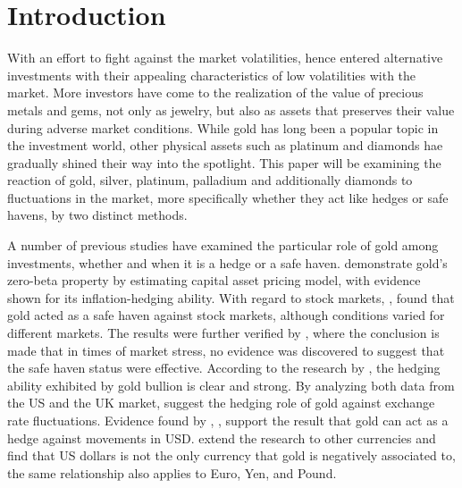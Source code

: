 \documentclass[preprint,authoryear,11pt]{elsarticle}
\begin{document}


\newpage
\section{Introduction}
\label{sec:introduction} \glsresetall

With an effort to fight against the market volatilities, hence entered alternative investments with their appealing characteristics of low volatilities with the market. More investors have come to the realization of the value of precious metals and gems, not only as jewelry, but also as assets that preserves their value during adverse market conditions. While gold has long been a popular topic in the investment world, other physical assets such as platinum and diamonds hae gradually shined their way into the spotlight. This paper will be examining the reaction of gold, silver, platinum, palladium and additionally diamonds to fluctuations in the market, more specifically whether they act like hedges or safe havens, by two distinct methods.

A number of previous studies have examined the particular role of gold among investments, whether and when it is a hedge or a safe haven. \citet{mccown_is_2006} demonstrate gold's zero-beta property by estimating capital asset pricing model, with evidence shown for its inflation-hedging ability. With regard to stock markets, \citet{baur_is_2009}, \citet{baur_is_2010} found that gold acted as a safe haven against stock markets, although conditions varied for different markets. The results were further verified by \citet{joy_gold_2011}, where the conclusion is made that in times of market stress, no evidence was discovered to suggest that the safe haven status were effective. According to the research by \citet{pullen_comparative_2011}, the hedging ability exhibited by gold bullion is clear and strong. By analyzing both data from the US and the UK market,\citet{ciner_hedges_2013} suggest the hedging role of gold against exchange rate fluctuations. Evidence found by \citet{reboredo_is_2013}, \citet{joy_gold_2011}, \citet{capie_gold_2005} support the result that gold can act as a hedge against movements in USD. \citet{pukthuanthong_gold_2011} extend the research to other currencies and find that US dollars is not the only currency that gold is negatively associated to, the same relationship also applies to Euro, Yen, and Pound.
\end{document}
